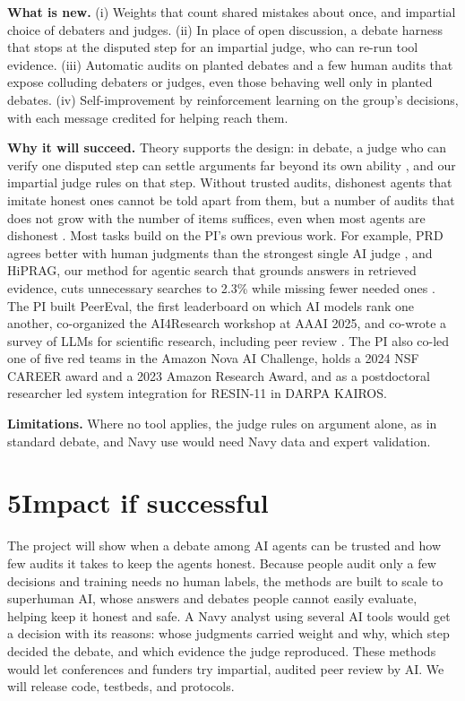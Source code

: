 \documentclass[12pt,letterpaper]{article}
\begin{document}
\textbf{What is new.} (i) Weights that count shared mistakes about once, and impartial choice of debaters and judges. (ii) In place of open discussion, a debate harness that stops at the disputed step for an impartial judge, who can re-run tool evidence. (iii) Automatic audits on planted debates and a few human audits that expose colluding debaters or judges, even those behaving well only in planted debates. (iv) Self-improvement by reinforcement learning on the group's decisions, with each message credited for helping reach them.

\textbf{Why it will succeed.} Theory supports the design: in debate, a judge who can verify one disputed step can settle arguments far beyond its own ability \citep{irving2018debate}, and our impartial judge rules on that step. Without trusted audits, dishonest agents that imitate honest ones cannot be told apart from them, but a number of audits that does not grow with the number of items suffices, even when most agents are dishonest \citep{steinhardt2016avoiding}. Most tasks build on the PI's own previous work. For example, PRD agrees better with human judgments than the strongest single AI judge \citep{li2024prd}, and HiPRAG, our method for agentic search that grounds answers in retrieved evidence, cuts unnecessary searches to 2.3\% while missing fewer needed ones \citep{wu2026hiprag}. The PI built PeerEval, the first leaderboard on which AI models rank one another, co-organized the AI4Research workshop at AAAI 2025, and co-wrote a survey of LLMs for scientific research, including peer review \citep{luo2025llm4sr}. The PI also co-led one of five red teams in the Amazon Nova AI Challenge, holds a 2024 NSF CAREER award and a 2023 Amazon Research Award, and as a postdoctoral researcher led system integration for RESIN-11 in DARPA KAIROS.

\textbf{Limitations.} Where no tool applies, the judge rules on argument alone, as in standard debate, and Navy use would need Navy data and expert validation.

\section*{5\quad Impact if successful}
The project will show when a debate among AI agents can be trusted and how few audits it takes to keep the agents honest. Because people audit only a few decisions and training needs no human labels, the methods are built to scale to superhuman AI, whose answers and debates people cannot easily evaluate, helping keep it honest and safe. A Navy analyst using several AI tools would get a decision with its reasons: whose judgments carried weight and why, which step decided the debate, and which evidence the judge reproduced. These methods would let conferences and funders try impartial, audited peer review by AI. We will release code, testbeds, and protocols.
\end{document}
